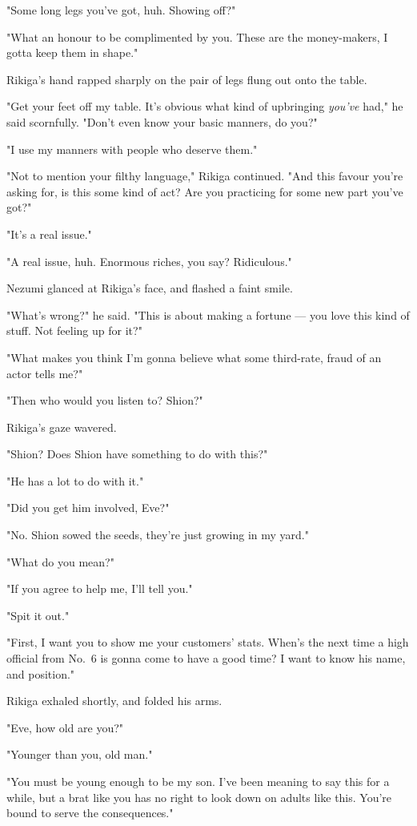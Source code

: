 "Some long legs you've got, huh. Showing off?"

"What an honour to be complimented by you. These are the money-makers, I
gotta keep them in shape."

Rikiga's hand rapped sharply on the pair of legs flung out onto the
table.

"Get your feet off my table. It's obvious what kind of upbringing \emph{you've}
had," he said scornfully. "Don't even know your basic manners, do you?"

"I use my manners with people who deserve them."

"Not to mention your filthy language," Rikiga continued. "And this
favour you're asking for, is this some kind of act? Are you practicing
for some new part you've got?"

"It's a real issue."

"A real issue, huh. Enormous riches, you say? Ridiculous."

Nezumi glanced at Rikiga's face, and flashed a faint smile.

"What's wrong?" he said. "This is about making a fortune --- you love this
kind of stuff. Not feeling up for it?"

"What makes you think I'm gonna believe what some third-rate, fraud of
an actor tells me?"

"Then who would you listen to? Shion?"

Rikiga's gaze wavered.

"Shion? Does Shion have something to do with this?"

"He has a lot to do with it."

"Did you get him involved, Eve?"

"No. Shion sowed the seeds, they're just growing in my yard."

"What do you mean?"

"If you agree to help me, I'll tell you."

"Spit it out."

"First, I want you to show me your customers' stats. When's the next
time a high official from No.~6 is gonna come to have a good time? I
want to know his name, and position."

Rikiga exhaled shortly, and folded his arms.

"Eve, how old are you?"

"Younger than you, old man."

"You must be young enough to be my son. I've been meaning to say this
for a while, but a brat like you has no right to look down on adults
like this. You're bound to serve the consequences."

